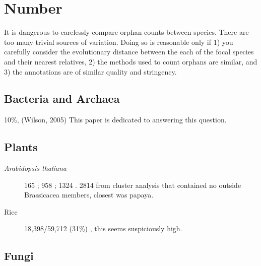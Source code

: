 \section{Number}

It is dangerous to carelessly compare orphan counts between species. There are
too many trivial sources of variation. Doing so is reasonable only if 1) you
carefully consider the evolutionary distance between the each of the focal
species and their nearest relatives, 2) the methods used to count orphans are
similar, and 3) the annotations are of similar quality and stringency.

\subsection{Bacteria and Archaea}

    10\%, (Wilson, 2005) \cite{wilson_orphans_2005} This paper is dedicated
    to answering this question.

\subsection{Plants}

    \begin{description}

        \item[\textit{Arabidopsis thaliana}] 165 \cite{yang_genome-wide_2009};
            958 \cite{donoghue_evolutionary_2011}; 1324
            \cite{lin_comparative_2010}. 2814 from cluster analysis that
            contained no outside Brassicacea members, closest was papaya.
            \cite{ye_evolutionary_2013}

        \item[Rice] 18,398/59,712 (31\%) \cite{guo_significant_2007}, this
            seems suspiciously high.

    \end{description}

\subsection{Fungi}

